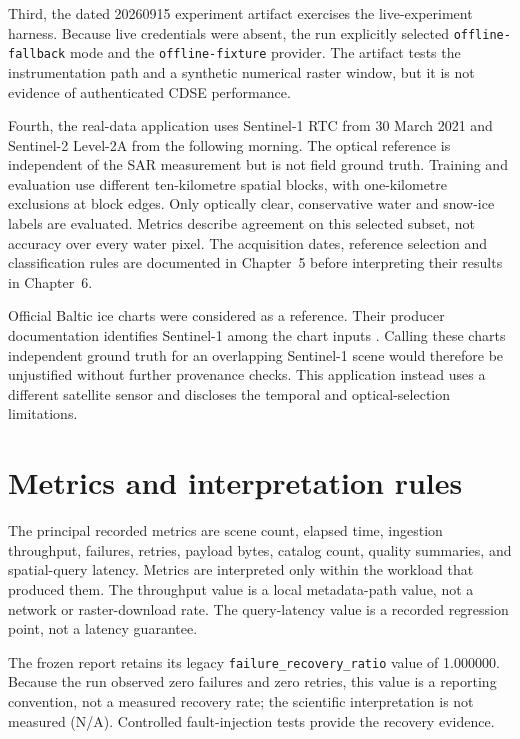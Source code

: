 Third, the dated 20260915 experiment artifact exercises the live-experiment harness. Because
live credentials were absent, the run explicitly selected \texttt{offline-fallback} mode and
the \texttt{offline-fixture} provider. The artifact tests the instrumentation path and a
synthetic numerical raster window, but it is not evidence of authenticated CDSE performance.

Fourth, the real-data application uses Sentinel-1 RTC from 30 March 2021 and Sentinel-2 Level-2A from the following morning. The optical reference is independent of the SAR measurement but is not field ground truth. Training and evaluation use different ten-kilometre spatial blocks, with one-kilometre exclusions at block edges. Only optically clear, conservative water and snow-ice labels are evaluated. Metrics describe agreement on this selected subset, not accuracy over every water pixel. The acquisition dates, reference selection and classification rules are documented in Chapter~5 before interpreting their results in Chapter~6.

Official Baltic ice charts were considered as a reference. Their producer documentation identifies Sentinel-1 among the chart inputs \citep{cmems-ice-pum}. Calling these charts independent ground truth for an overlapping Sentinel-1 scene would therefore be unjustified without further provenance checks. This application instead uses a different satellite sensor and discloses the temporal and optical-selection limitations.

\section{Metrics and interpretation rules}

The principal recorded metrics are scene count, elapsed time, ingestion throughput, failures, retries, payload bytes, catalog count, quality summaries, and spatial-query latency. Metrics are interpreted only within the workload that produced them. The throughput value is a local metadata-path value, not a network or raster-download rate. The query-latency value is a recorded regression point, not a latency guarantee.

The frozen report retains its legacy \texttt{failure\_recovery\_ratio} value of 1.000000.
Because the run observed zero failures and zero retries, this value is a reporting convention,
not a measured recovery rate; the scientific interpretation is not measured (N/A). Controlled
fault-injection tests provide the recovery evidence.

